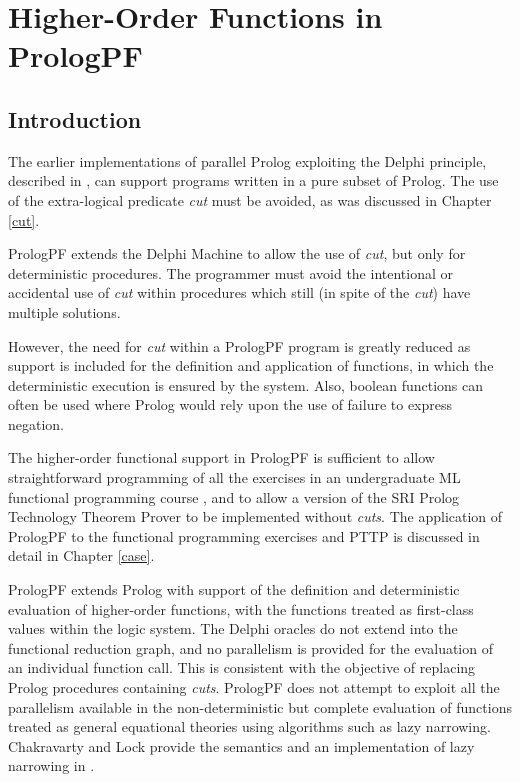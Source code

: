 \chapter{Higher-Order Functions in PrologPF}
\label{functions}

\section{Introduction} %

The earlier implementations of parallel Prolog exploiting the Delphi
principle, described in \cite{CA87,Clo87,Wre90,Kle91,Sar95},
can support programs written in a pure subset of Prolog.  The use of
the extra-logical predicate \textit{cut} must be avoided, as was discussed in
Chapter \ref{cut}.

PrologPF extends the Delphi Machine to allow the use of \textit{cut},
but only for
deterministic procedures.  The programmer must avoid the
intentional or accidental use of \textit{cut} within
procedures which still (in spite of the \textit{cut}) have
multiple solutions.  

However, the need for \textit{cut} within a
PrologPF program is greatly reduced as
support is included for the definition and application
of functions, in which the deterministic
execution is ensured by the system.  Also, boolean functions can often
be used where Prolog would rely upon the use of failure to express negation.

The higher-order functional support in PrologPF is sufficient to allow
straightforward programming of all the exercises in an undergraduate ML
functional programming course \cite{Pau88}, and to allow a version of the SRI Prolog 
Technology Theorem Prover \cite{Sti88} to be implemented without \textit{cuts}.
The application of PrologPF to the functional programming exercises and PTTP is
discussed in detail in Chapter \ref{case}.

PrologPF extends Prolog with support of the definition and deterministic
evaluation of higher-order functions, with the functions treated as
first-class values within the logic system.  The Delphi oracles do not
extend into the functional reduction graph, and no parallelism is provided for
the evaluation of an individual function call.  This is consistent with the
objective of replacing Prolog procedures containing \textit{cuts}.  
PrologPF does not
attempt to exploit all the parallelism available in the non-deterministic but
complete evaluation of functions treated as general equational theories using
algorithms such as lazy narrowing.  Chakravarty and Lock provide the semantics and
an implementation of lazy narrowing in \cite{CL91}.

